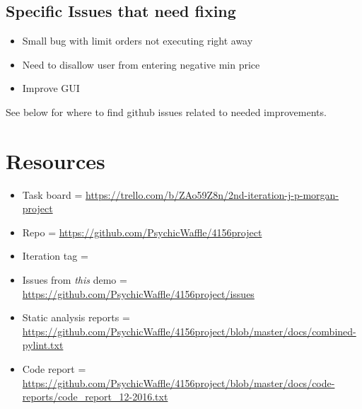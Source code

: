 \documentclass{article}
\begin{document}
\subsection{Specific Issues that need fixing}
\begin{itemize}
\item Small bug with limit orders not executing right away
\item Need to disallow user from entering negative min price
\item Improve GUI
\end{itemize}
See below for where to find github issues related to needed improvements.

\section{Resources}
\begin{itemize}
\item Task board = \url{https://trello.com/b/ZAo59Z8n/2nd-iteration-j-p-morgan-project}
\item Repo = \url{https://github.com/PsychicWaffle/4156project}
\item Iteration tag = 
\item Issues from \emph{this} demo = \url{https://github.com/PsychicWaffle/4156project/issues}
\item Static analysis reports = \url{https://github.com/PsychicWaffle/4156project/blob/master/docs/combined-pylint.txt}
\item Code report = \url{https://github.com/PsychicWaffle/4156project/blob/master/docs/code-reports/code_report_12-2016.txt}
\end{itemize}
\end{document}
